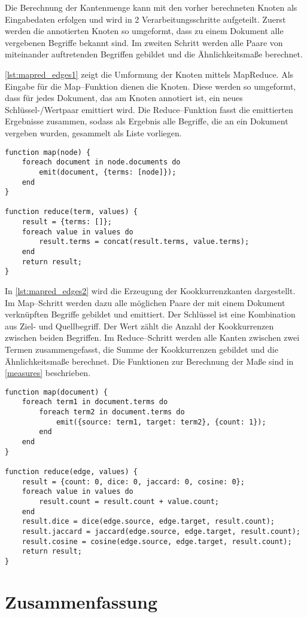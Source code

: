 Die Berechnung der Kantenmenge kann mit den vorher berechneten Knoten als Eingabedaten erfolgen und wird in 2 Verarbeitungsschritte aufgeteilt. Zuerst werden die annotierten Knoten so umgeformt, dass zu einem Dokument alle vergebenen Begriffe bekannt sind. Im zweiten Schritt werden alle Paare von miteinander auftretenden Begriffen gebildet und die Ähnlichkeitsmaße berechnet.

\cref{lst:mapred_edges1} zeigt die Umformung der Knoten mittels MapReduce. Als Eingabe für die Map--Funktion dienen die Knoten. Diese werden so umgeformt, dass für jedes Dokument, das am Knoten annotiert ist, ein neues Schlüssel-/Wertpaar emittiert wird. Die Reduce--Funktion fasst die emittierten Ergebnisse zusammen, sodass als Ergebnis alle Begriffe, die an ein Dokument vergeben wurden, gesammelt als Liste vorliegen.

\begin{lstlisting}[language=pseudo, label={lst:mapred_edges1}, caption={Umformung der Knoten mit MapReduce}]
function map(node) {
    foreach document in node.documents do
        emit(document, {terms: [node]});
    end
}

function reduce(term, values) {
    result = {terms: []};
    foreach value in values do
        result.terms = concat(result.terms, value.terms);
    end
    return result;
}
\end{lstlisting}

In \cref{lst:mapred_edges2} wird die Erzeugung der Kookkurrenzkanten dargestellt. Im Map--Schritt werden dazu alle möglichen Paare der mit einem Dokument verknüpften Begriffe gebildet und emittiert. Der Schlüssel ist eine Kombination aus Ziel- und Quellbegriff. Der Wert zählt die Anzahl der Kookkurrenzen zwischen beiden Begriffen. Im Reduce--Schritt werden alle Kanten zwischen zwei Termen zusammengefasst, die Summe der Kookkurrenzen gebildet und die Ähnlichkeitsmaße berechnet. Die Funktionen zur Berechnung der Maße sind in \cref{measures} beschrieben.

\begin{lstlisting}[language=pseudo, label={lst:mapred_edges2}, caption={Kantenerzeugung mit MapReduce}]
function map(document) {
    foreach term1 in document.terms do
        foreach term2 in document.terms do
            emit({source: term1, target: term2}, {count: 1});
        end
    end
}

function reduce(edge, values) {
    result = {count: 0, dice: 0, jaccard: 0, cosine: 0};
    foreach value in values do
        result.count = result.count + value.count;
    end
    result.dice = dice(edge.source, edge.target, result.count);
    result.jaccard = jaccard(edge.source, edge.target, result.count);
    result.cosine = cosine(edge.source, edge.target, result.count);
    return result;
}
\end{lstlisting}

\section{Zusammenfassung}